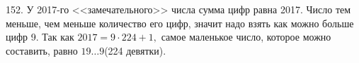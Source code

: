 152. У 2017-го <<замечательного>> числа сумма цифр равна 2017. Число тем меньше, чем меньше количество его цифр, значит надо взять как можно больше цифр 9. Так как
$2017=9\cdot224+1,$ самое маленькое число, которое можно составить, равно $19\ldots9$(224 девятки).\\
